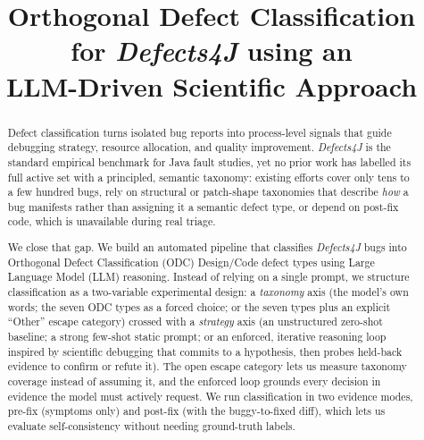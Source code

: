\begin{frontmatter}

\title{Orthogonal Defect Classification for \textit{Defects4J} using an\\
       LLM-Driven Scientific Approach}






\begin{abstract}
Defect classification turns isolated bug reports into process-level signals that
guide debugging strategy, resource allocation, and quality improvement.
\textit{Defects4J} is the standard empirical benchmark for Java fault studies,
yet no prior work has labelled its full active set with a principled,
semantic taxonomy: existing efforts cover only tens to a few hundred bugs,
rely on structural or patch-shape taxonomies that describe \emph{how} a bug
manifests rather than assigning it a semantic defect type, or depend on
post-fix code, which is unavailable during real triage.

We close that gap. We build an automated pipeline that classifies
\textit{Defects4J} bugs into
Orthogonal Defect Classification (ODC) Design/Code defect types using Large
Language Model (LLM) reasoning. Instead of relying on a single prompt, we
structure classification as a two-variable experimental design: a
\emph{taxonomy} axis (the model's own words; the seven ODC types as a forced
choice; or the seven types plus an explicit ``Other'' escape category) crossed
with a \emph{strategy} axis (an unstructured zero-shot baseline; a strong
few-shot static prompt; or an enforced, iterative reasoning loop inspired by
scientific debugging that commits to a hypothesis, then probes held-back
evidence to confirm or refute it). The open escape category lets us measure
taxonomy coverage instead of assuming it, and the enforced loop grounds every
decision in evidence the model must actively request. We run classification in
two evidence modes, pre-fix (symptoms only) and post-fix (with the
buggy-to-fixed diff), which lets us evaluate self-consistency without needing
ground-truth labels.


\end{abstract}
\end{frontmatter}
